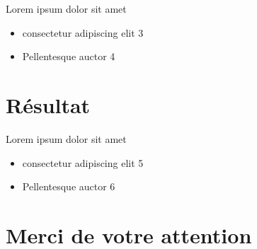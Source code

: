 \documentclass{beamer}
\begin{document}
\begin{frame}{Lorem ipsum dolor sit amet}
\begin{itemize}
\item consectetur adipiscing elit 3
\item Pellentesque auctor 4
\end{itemize}
\end{frame}


\section{Résultat}\label{Résultat}

\begin{frame}{Lorem ipsum dolor sit amet}
\begin{itemize}
\item consectetur adipiscing elit 5
\item Pellentesque auctor 6
\end{itemize}
\end{frame}

\section{Merci de votre attention}\label{Merci}
\end{document}
